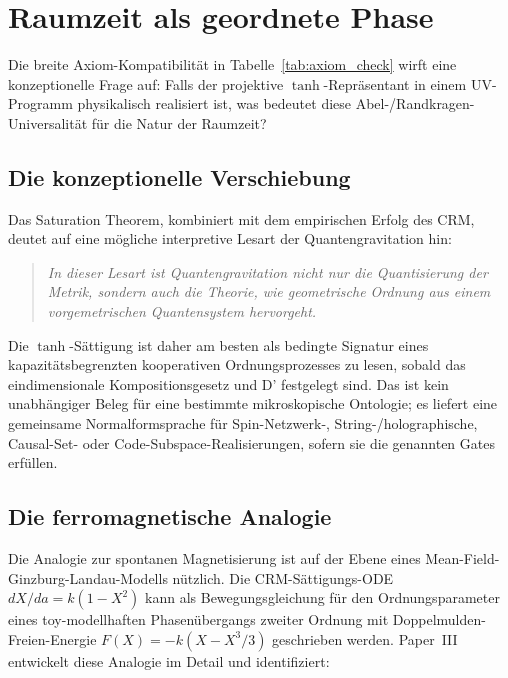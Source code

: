 \documentclass[aps,prd,twocolumn,superscriptaddress,nofootinbib]{revtex4-2}
\begin{document}
\section{Raumzeit als geordnete Phase}
\label{sec:ontology}

Die breite Axiom-Kompatibilität in Tabelle~\ref{tab:axiom_check} wirft eine konzeptionelle Frage auf: Falls der projektive $\tanh$-Repräsentant in einem UV-Programm physikalisch realisiert ist, was bedeutet diese Abel-/Randkragen-Universalität für die Natur der Raumzeit?

\subsection{Die konzeptionelle Verschiebung}

Das Saturation Theorem, kombiniert mit dem empirischen Erfolg des CRM, deutet auf eine mögliche interpretive Lesart der Quantengravitation hin:

\begin{quote}
\textit{In dieser Lesart ist Quantengravitation nicht nur die Quantisierung der Metrik, sondern auch die Theorie, wie geometrische Ordnung aus einem vorgemetrischen Quantensystem hervorgeht.}
\end{quote}

Die $\tanh$-Sättigung ist daher am besten als bedingte Signatur eines kapazitätsbegrenzten kooperativen Ordnungsprozesses zu lesen, sobald das eindimensionale Kompositionsgesetz und D' festgelegt sind. Das ist kein unabhängiger Beleg für eine bestimmte mikroskopische Ontologie; es liefert eine gemeinsame Normalformsprache für Spin-Netzwerk-, String-/holographische, Causal-Set- oder Code-Subspace-Realisierungen, sofern sie die genannten Gates erfüllen.

\subsection{Die ferromagnetische Analogie}

Die Analogie zur spontanen Magnetisierung ist auf der Ebene eines Mean-Field-Ginzburg-Landau-Modells nützlich. Die CRM-Sättigungs-ODE $dX/da = k(1 - X^2)$ kann als Bewegungsgleichung für den Ordnungsparameter eines toy-modellhaften Phasenübergangs zweiter Ordnung mit Doppelmulden-Freien-Energie $F(X) = -k(X - X^3/3)$ geschrieben werden. Paper~III \cite{Geiger2026c} entwickelt diese Analogie im Detail und identifiziert:
\end{document}
